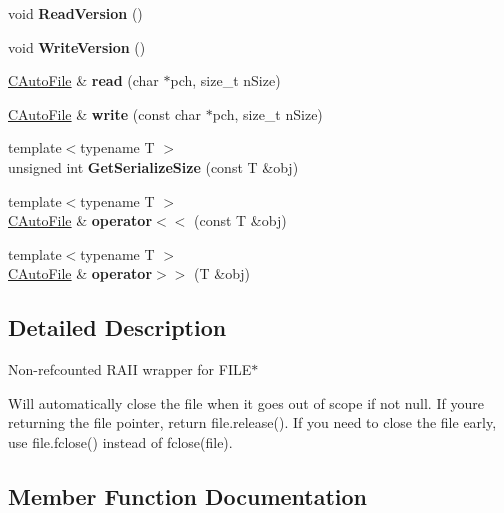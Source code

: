 \begin{DoxyCompactItemize}
void {\bfseries Read\+Version} ()
\item 
\mbox{\label{class_c_auto_file_a23d6f22c3aff80be7665bfc5a77a01ff}} 
void {\bfseries Write\+Version} ()
\item 
\mbox{\label{class_c_auto_file_a87e670f3dd03055264c05b25335babb4}} 
\mbox{\hyperlink{class_c_auto_file}{C\+Auto\+File}} \& {\bfseries read} (char $\ast$pch, size\+\_\+t n\+Size)
\item 
\mbox{\label{class_c_auto_file_a7b2852b345b75835f883be3732cf826a}} 
\mbox{\hyperlink{class_c_auto_file}{C\+Auto\+File}} \& {\bfseries write} (const char $\ast$pch, size\+\_\+t n\+Size)
\item 
\mbox{\label{class_c_auto_file_a883a261f0d7d0320f72152ff2167fd24}} 
{\footnotesize template$<$typename T $>$ }\\unsigned int {\bfseries Get\+Serialize\+Size} (const T \&obj)
\item 
\mbox{\label{class_c_auto_file_a8e194596d1f8f64059247724b25df82c}} 
{\footnotesize template$<$typename T $>$ }\\\mbox{\hyperlink{class_c_auto_file}{C\+Auto\+File}} \& {\bfseries operator$<$$<$} (const T \&obj)
\item 
\mbox{\label{class_c_auto_file_ae6826219322626d2ac8229e022c41dd7}} 
{\footnotesize template$<$typename T $>$ }\\\mbox{\hyperlink{class_c_auto_file}{C\+Auto\+File}} \& {\bfseries operator$>$$>$} (T \&obj)
\end{DoxyCompactItemize}


\subsection{Detailed Description}
Non-\/refcounted R\+A\+II wrapper for F\+I\+L\+E$\ast$

Will automatically close the file when it goes out of scope if not null. If you\textquotesingle{}re returning the file pointer, return file.\+release(). If you need to close the file early, use file.\+fclose() instead of fclose(file). 

\subsection{Member Function Documentation}
\mbox{\label{class_c_auto_file_a2c1ad2d25562fea82a54bdef2793a0dd}} 
